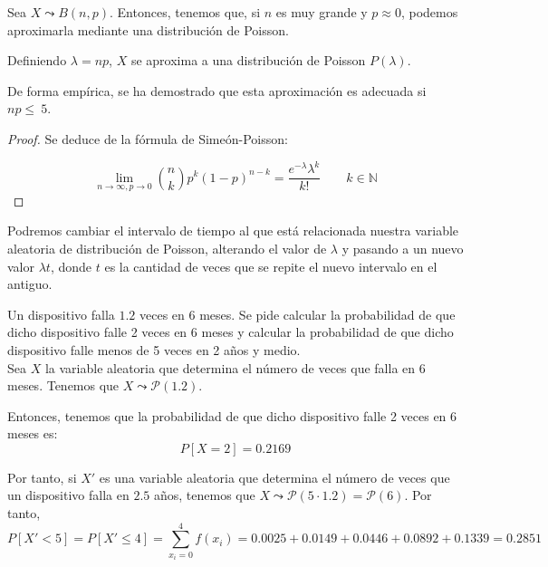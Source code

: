 \begin{prop}
    Sea $X\leadsto B(n,p)$. Entonces, tenemos que, si $n$ es muy grande y $p\approx 0$, podemos aproximarla mediante una distribución de Poisson.
    
    Definiendo $\lambda=np$, $X$ se aproxima a una distribución de Poisson $P(\lambda)$.

    De forma empírica, se ha demostrado que esta aproximación es adecuada si $np\leq~5$.
    
\end{prop}
\begin{proof}

    Se deduce de la fórmula de Simeón-Poisson:
    
    \begin{equation*}
        \lim_{n\to \infty,p\to 0}\binom{n}{k}p^k(1-p)^{n-k} = \frac{e^{-\lambda}\lambda^k}{k!} \qquad k\in \mathbb{N}
    \end{equation*}
\end{proof}


\begin{observacion}
    Podremos cambiar el intervalo de tiempo al que está relacionada nuestra variable aleatoria de distribución de Poisson, alterando el valor de $\lambda$ y pasando a un nuevo valor $\lambda t$, donde $t$ es la cantidad de veces que se repite el nuevo intervalo en el antiguo.
\end{observacion}
\begin{ejemplo}
    Un dispositivo falla $1.2$ veces en 6 meses. Se pide calcular la probabilidad de que dicho dispositivo falle 2 veces en 6 meses y calcular la probabilidad de que dicho dispositivo falle menos de 5 veces en 2 años y medio.\\

    Sea $X$ la variable aleatoria que determina el número de veces que falla en 6 meses. Tenemos que $X\leadsto \mathcal{P}(1.2)$.

    Entonces, tenemos que la probabilidad de que dicho dispositivo falle 2 veces en 6 meses es:
    \begin{equation*}
        P[X=2]=0.2169
    \end{equation*}

    Por tanto, si $X'$ es una variable aleatoria que determina el número de veces que un dispositivo falla en $2.5$ años, tenemos que $X\leadsto \mathcal{P}(5\cdot 1.2)=\mathcal{P}(6)$. Por tanto,
    \begin{equation*}
        P[X'< 5] =P[X'\leq 4]=\sum_{x_i=0}^4f(x_i) = 0.0025 + 0.0149 + 0.0446 +0.0892+0.1339=0.2851
    \end{equation*}
\end{ejemplo}




